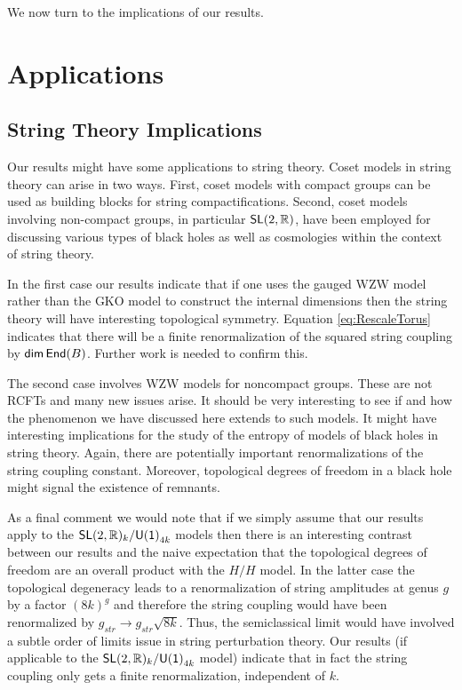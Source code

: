 \documentclass[a4paper,11pt]{article}
\newcommand{\tsf}[1]{\textsf{#1}}
\def\IR{{\mathbb{R}}}
\def\rem{$\clubsuit$}
\newcommand{\cg}[1]{\marginpar{\raggedright \tiny \rem #1 \rem}} %
\newcommand{\cran}[1]{\marginpar{\raggedright \tiny \textcolor{OliveGreen}{\rem RKS: #1 \rem}}}    %
\begin{document}
%
%




We now turn to the implications of our results.

\section{Applications}
\subsection{String Theory Implications}\label{sec:implications}


Our results might have some applications to string theory. Coset models in string theory can arise in two ways. First, coset models with compact groups can be used as building blocks for string compactifications. Second, coset models involving non-compact groups, in particular $\mr{SL}(2,\IR)$, have been employed for discussing various types of black holes as well as cosmologies \cite{Elitzur:1990ubs,Mandal:1991tz,Witten:1991yr,Elitzur:2002rt,Nappi:1992kv,Kounnas:1992wc,Giveon:2003gb} within the context of string theory. 

In the first case our results indicate that if one uses the gauged \tsf{WZW} model rather than the \tsf{GKO} model to construct the internal dimensions then the string theory will have interesting topological symmetry. Equation \eqref{eq:RescaleTorus} indicates that there will be a finite renormalization of the squared string coupling by $\mathsf{dim}\, \mathsf{End}(B)$. Further work is needed to confirm this.

The second case involves \tsf{WZW} models for noncompact groups. These are not \tsf{RCFT}s and many new issues arise. It should be very interesting to see if and how the phenomenon we have discussed here extends to such models. It might have interesting implications for the study of the entropy of models of black holes in string theory. Again, there are potentially important renormalizations of the string coupling constant. Moreover, topological degrees of freedom in a black hole might signal the existence of remnants. 

As a final comment we would note that if  we simply assume that our results apply to the $\mr{SL}(2,\IR)_k/\mr{U(1)}_{4k}$ models then there is an interesting contrast between our results and the naive expectation that the topological degrees of freedom are an overall product with the $H/H$ model. In the latter case the topological degeneracy leads to a renormalization of string amplitudes at genus $g$ by a factor $(8k)^{g}$ and therefore the string coupling would have been renormalized by $g_{str} \to g_{str} \sqrt{8k}$. Thus, the semiclassical limit would have involved a subtle order of limits issue in string perturbation theory. Our results (if applicable to the $\mr{SL}(2,\IR)_k/\mr{U(1)}_{4k}$ model) indicate that  in fact the string coupling only gets a finite renormalization, independent of $k$. 
\end{document}
